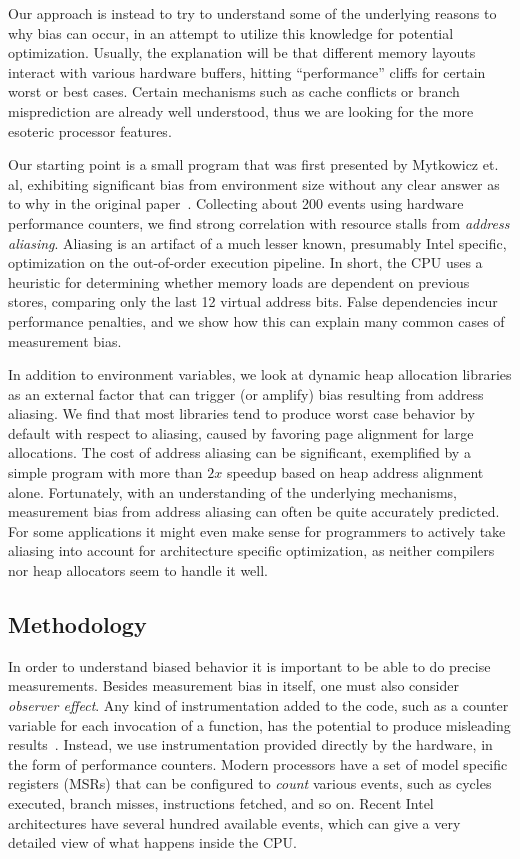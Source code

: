 \documentclass[prodmode,acmtaco]{acmsmall}
\begin{document}
Our approach is instead to try to understand some of the underlying reasons to why bias can occur, in an attempt to utilize this knowledge for potential optimization. %
Usually, the explanation will be that different memory layouts interact with various hardware buffers, hitting ``performance'' cliffs for certain worst or best cases.
Certain mechanisms such as cache conflicts or branch misprediction are already well understood, thus we are looking for the more esoteric processor features.

Our starting point is a small program that was first presented by Mytkowicz et. al, exhibiting significant bias from environment size without any clear answer as to why in the original paper~\cite{Mytkowicz:2009:WrongData}.
Collecting about 200 events using hardware performance counters, we find strong correlation with resource stalls from \emph{address aliasing}.
Aliasing is an artifact of a much lesser known, presumably Intel specific, optimization on the out-of-order execution pipeline.
In short, the CPU uses a heuristic for determining whether memory loads are dependent on previous stores, comparing only the last 12 virtual address bits.
False dependencies incur performance penalties, and we show how this can explain many common cases of measurement bias.

In addition to environment variables, we look at dynamic heap allocation libraries as an external factor that can trigger (or amplify) bias resulting from address aliasing.
We find that most libraries tend to produce worst case behavior by default with respect to aliasing, caused by favoring page alignment for large allocations.
The cost of address aliasing can be significant, exemplified by a simple program with more than $2x$ speedup based on heap address alignment alone.
Fortunately, with an understanding of the underlying mechanisms, measurement bias from address aliasing can often be quite accurately predicted.
For some applications it might even make sense for programmers to actively take aliasing into account for architecture specific optimization, as neither compilers nor heap allocators seem to handle it well.


\subsection{Methodology}
In order to understand biased behavior it is important to be able to do precise measurements.
Besides measurement bias in itself, one must also consider \emph{observer effect}.
Any kind of instrumentation added to the code, such as a counter variable for each invocation of a function, has the potential to produce misleading results~\cite{Mytkowicz:2008:OE&MB}.
Instead, we use instrumentation provided directly by the hardware, in the form of performance counters. 
Modern processors have a set of model specific registers (MSRs) that can be configured to \emph{count} various events, such as cycles executed, branch misses, instructions fetched, and so on.
Recent Intel architectures have several hundred available events, which can give a very detailed view of what happens inside the CPU.
\end{document}
